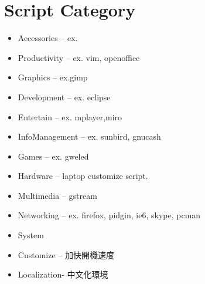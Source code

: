 \documentclass[letterpaper,10pt,english]{manual}
\begin{document}
\section{Script Category}
\begin{itemize}
\item {} 
Accessories – ex.

\item {} 
Productivity – ex. vim, openoffice

\item {} 
Graphics – ex.gimp

\item {} 
Development – ex. eclipse

\item {} 
Entertain – ex. mplayer,miro

\item {} 
InfoManagement – ex. sunbird, gnucash

\item {} 
Games – ex. gweled

\item {} 
Hardware – laptop customize script.

\item {} 
Multimedia – gstream

\item {} 
Networking – ex. firefox, pidgin, ie6, skype, pcman

\item {} 
System

\item {} 
Customize – 加快開機速度

\item {} 
Localization- 中文化環境

\end{itemize}
\end{document}
